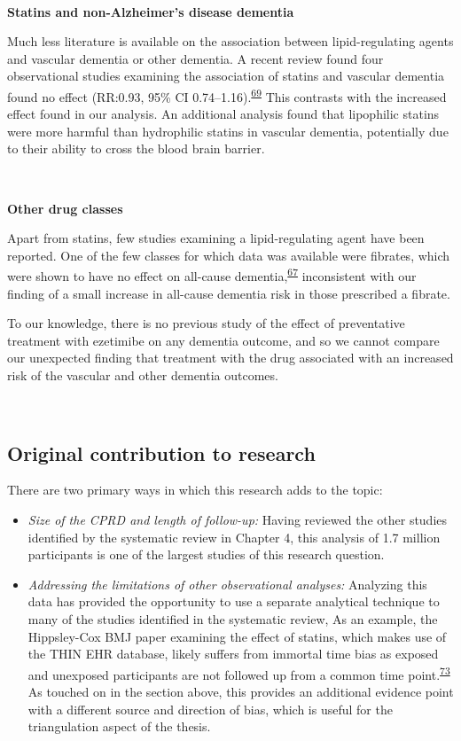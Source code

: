 \documentclass[a4paper, twoside]{templates/ociamthesis}
\providecommand{\tightlist}{%
  \setlength{\itemsep}{0pt}\setlength{\parskip}{0pt}}
\begin{document}
~

\textbf{Statins and non-Alzheimer's disease dementia}

Much less literature is available on the association between lipid-regulating agents and vascular dementia or other dementia. A recent review found four observational studies examining the association of statins and vascular dementia found no effect (RR:0.93, 95\% CI 0.74--1.16).\textsuperscript{\protect\hyperlink{ref-poly2020}{69}} This contrasts with the increased effect found in our analysis. An additional analysis found that lipophilic statins were more harmful than hydrophilic statins in vascular dementia, potentially due to their ability to cross the blood brain barrier.

~

\textbf{Other drug classes}

Apart from statins, few studies examining a lipid-regulating agent have been reported. One of the few classes for which data was available were fibrates, which were shown to have no effect on all-cause dementia,\textsuperscript{\protect\hyperlink{ref-ancelin2012}{67}} inconsistent with our finding of a small increase in all-cause dementia risk in those prescribed a fibrate.

To our knowledge, there is no previous study of the effect of preventative treatment with ezetimibe on any dementia outcome, and so we cannot compare our unexpected finding that treatment with the drug associated with an increased risk of the vascular and other dementia outcomes.

~

\hypertarget{original-contribution-to-research-1}{%
\subsection{Original contribution to research}\label{original-contribution-to-research-1}}

There are two primary ways in which this research adds to the topic:

\begin{itemize}
\tightlist
\item
  \emph{Size of the CPRD and length of follow-up:} Having reviewed the other studies identified by the systematic review in Chapter 4, this analysis of 1.7 million participants is one of the largest studies of this research question.
\item
  \emph{Addressing the limitations of other observational analyses:} Analyzing this data has provided the opportunity to use a separate analytical technique to many of the studies identified in the systematic review, As an example, the Hippsley-Cox BMJ paper examining the effect of statins, which makes use of the THIN EHR database, likely suffers from immortal time bias as exposed and unexposed participants are not followed up from a common time point.\textsuperscript{\protect\hyperlink{ref-hippisley-cox2010}{73}} As touched on in the section above, this provides an additional evidence point with a different source and direction of bias, which is useful for the triangulation aspect of the thesis.
\end{itemize}
\end{document}
